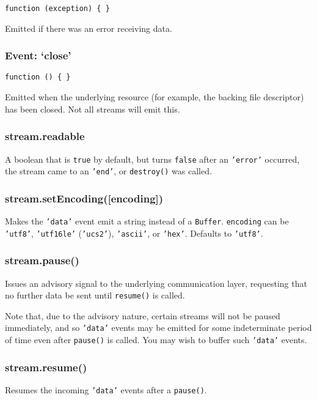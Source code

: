 \texttt{function (exception) \{ \}}

Emitted if there was an error receiving data.

\subsubsection{Event: `close'}

\texttt{function () \{ \}}

Emitted when the underlying resource (for example, the backing file
descriptor) has been closed. Not all streams will emit this.

\subsubsection{stream.readable}

A boolean that is \texttt{true} by default, but turns \texttt{false}
after an \texttt{'error'} occurred, the stream came to an
\texttt{'end'}, or \texttt{destroy()} was called.

\subsubsection{stream.setEncoding({[}encoding{]})}

Makes the \texttt{'data'} event emit a string instead of a
\texttt{Buffer}. \texttt{encoding} can be \texttt{'utf8'},
\texttt{'utf16le'} (\texttt{'ucs2'}), \texttt{'ascii'}, or
\texttt{'hex'}. Defaults to \texttt{'utf8'}.

\subsubsection{stream.pause()}

Issues an advisory signal to the underlying communication layer,
requesting that no further data be sent until \texttt{resume()} is
called.

Note that, due to the advisory nature, certain streams will not be
paused immediately, and so \texttt{'data'} events may be emitted for
some indeterminate period of time even after \texttt{pause()} is called.
You may wish to buffer such \texttt{'data'} events.

\subsubsection{stream.resume()}

Resumes the incoming \texttt{'data'} events after a \texttt{pause()}.

